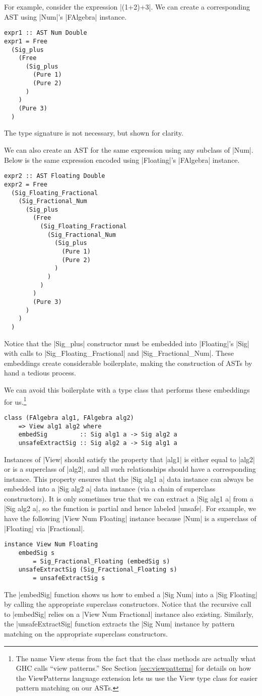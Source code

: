 \documentclass[preprint]{sigplanconf}
\theoremstyle{definition}
\begin{document}
For example, consider the expression |(1+2)+3|.
We can create a corresponding AST using |Num|'s |FAlgebra| instance.
\begin{lstlisting}
expr1 :: AST Num Double
expr1 = Free
  (Sig_plus
    (Free
      (Sig_plus
        (Pure 1)
        (Pure 2)
      )
    )
    (Pure 3)
  )
\end{lstlisting}
The type signature is not necessary, but shown for clarity.

We can also create an AST for the same expression using any subclass of |Num|.
Below is the same expression encoded using |Floating|'s |FAlgebra| instance.
\begin{lstlisting}
expr2 :: AST Floating Double
expr2 = Free
  (Sig_Floating_Fractional
    (Sig_Fractional_Num
      (Sig_plus
        (Free
          (Sig_Floating_Fractional
            (Sig_Fractional_Num
              (Sig_plus
                (Pure 1)
                (Pure 2)
              )
            )
          )
        )
        (Pure 3)
      )
    )
  )
\end{lstlisting}
Notice that the |Sig_plus| constructor must be embedded into |Floating|'s |Sig| with calls to |Sig_Floating_Fractional| and |Sig_Fractional_Num|.
These embeddings create considerable boilerplate,
making the construction of ASTs by hand a tedious process.

We can avoid this boilerplate with a type class that performs these embeddings for us.\footnote{
    The name {\ttfamily View} stems from the fact that the class methods are actually what GHC calls ``view patterns.''
    See Section \ref{sec:viewpatterns} for details on how the {\ttfamily ViewPatterns} language extension lets us use the {\ttfamily View} type class for easier pattern matching on our ASTs.
}
\begin{lstlisting}
class (FAlgebra alg1, FAlgebra alg2)
    => View alg1 alg2 where
    embedSig         :: Sig alg1 a -> Sig alg2 a
    unsafeExtractSig :: Sig alg2 a -> Sig alg1 a
\end{lstlisting}
Instances of |View| should satisfy the property that |alg1| is either equal to |alg2| or is a superclass of |alg2|, and
all such relationships should have a corresponding instance.
This property ensures that the |Sig alg1 a| data instance can always be embedded into a |Sig alg2 a| data instance (via a chain of superclass constructors).
It is only sometimes true that we can extract a |Sig alg1 a| from a |Sig alg2 a|,
so the function is partial and hence labeled |unsafe|.
For example,
we have the following |View Num Floating| instance because |Num| is a superclass of |Floating| via |Fractional|.
\begin{lstlisting}
instance View Num Floating
    embedSig s
        = Sig_Fractional_Floating (embedSig s)
    unsafeExtractSig (Sig_Fractional_Floating s)
        = unsafeExtractSig s
\end{lstlisting}
The |embedSig| function shows us how to embed a |Sig Num| into a |Sig Floating| by calling the appropriate superclass constructors.
Notice that the recursive call to |embedSig| relies on a |View Num Fractional| instance also existing.
Similarly, the |unsafeExtractSig| function extracts the |Sig Num| instance by pattern matching on the appropriate superclass constructors.
\end{document}
